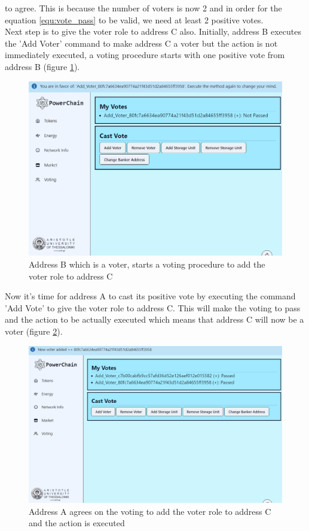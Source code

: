to agree. This is because the number of voters is now 2 and in order for the equation \ref{equ:vote_pass} to be valid,
we need at least 2 positive votes.\\
Next step is to give the voter role to address C also. Initially, address B executes the 'Add Voter' command to make address
C a voter but the action is not immediately executed, a voting procedure starts with one positive vote from address B (figure \ref{fig:add_voter_1}).
\begin{figure}[h!]
    \centering
    \includegraphics[width=\linewidth,frame,scale=0.7]{Figures/add_voter_1.png}
    \caption{Address B which is a voter, starts a voting procedure to add the voter role to address C}
    \label{fig:add_voter_1}
\end{figure}
Now it's time for address A to cast its positive vote by executing the command 'Add Vote' to give the voter
role to address C. This will make the voting to pass and the action to be actually executed which means that address C
will now be a voter (figure \ref{fig:add_voter_2}).\\
\begin{figure}[h!]
    \centering
    \includegraphics[width=\linewidth,frame,scale=0.7]{Figures/add_voter_2.png}
    \caption{Address A agrees on the voting to add the voter role to address C and the action is executed}
    \label{fig:add_voter_2}
\end{figure}
